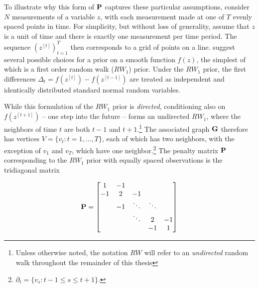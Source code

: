 To illustrate why this form of $\mathbf{P}$ captures these particular assumptions, consider $N$ measurements of a variable $z$, with each measurement made at one of $T$ evenly spaced points in time. For simplicity, but without loss of generality,  assume that $z$ is a unit of time and there is exactly one measurement per time period.  The sequence $(z^{[t]})_{t=1}^T$ then corresponds to a grid of points on a line.   suggest several possible choices for a prior on a smooth function $f(z)$, the simplest of which is a first order random walk ($RW_1$) prior.  Under the $RW_1$ prior, the first differences $\Delta_t = f(z^{[t]}) - f(z^{[t-1]})$ are treated as independent and identically distributed standard normal random variables. 

While this formulation of the $RW_1$ prior is {\it directed}, conditioning also on $f(z^{[t+1]})$ -- one step into the future -- forms an undirected $RW_1$, where the neighbors of time $t$ are both $t-1$ and $t+1$.\footnote{Unless otherwise noted, the notation $RW$ will refer to an {\it undirected} random walk throughout the remainder of this thesis} The associated graph $\mathbf{G}$ therefore has vertices $V=\{v_t : t=1,\dots,T\}$, each of which has two neighbors, with the exception of $v_1$ and $v_T$, which have one neighbor.\footnote{$\partial_t = \{v_{s} : t - 1 \leq s \leq t + 1\}.$}  The penalty matrix $\mathbf{P}$ corresponding to the $RW_1$ prior with equally spaced observations is the tridiagonal matrix

\begin{equation*}
\mathbf{P} = 
\begin{bmatrix}
1  	& -1 	& 		& 	& \\
-1  	& 2 	& -1 		& 	& \\
  	& -1 	& \ddots 	& \ddots	& \\
  	&  	& \ddots 	& 2 	& -1\\
  	&  	& 		& -1 	& 1\\
\end{bmatrix}
\end{equation*}

